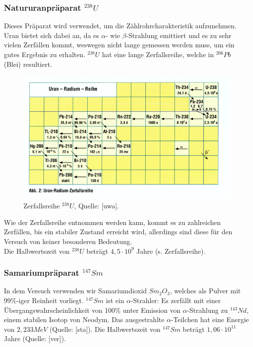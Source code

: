 \subsubsection{Natururanpräparat $^{238}U$}
Dieses Präparat wird verwendet, um die Zählrohrcharakteristik aufzunehmen. Uran bietet sich dabei an, da es $\alpha$- wie $\beta$-Strahlung emittiert und es zu sehr vielen Zerfällen kommt, weswegen nicht lange gemessen werden muss, um ein gutes Ergebnis zu erhalten. $^{238}U$ hat eine lange Zerfallsreihe, welche in $^{206}Pb$ (Blei) resultiert. 
\begin{figure}[h]
\begin{center}
\includegraphics[scale=0.6]{Bilder/uran}
\caption{Zerfallsreihe $^{238}U$, Quelle: [uwa].}
\end{center}
\end{figure}
Wie der Zerfallsreihe entnommen werden kann, kommt es zu zahlreichen Zerfällen, bis ein stabiler Zustand erreicht wird, allerdings sind diese für den Versuch von keiner besonderen Bedeutung. \\
Die Halbwertszeit von $^{238}U$ beträgt $4,5\cdot10^{9}$ Jahre (s. Zerfallsreihe).
\subsubsection{Samariumpräparat $^{147}Sm$}
In dem Versuch verwenden wir Samariumdioxid $Sm_{2}O_{3}$, welches als Pulver mit 99\%-iger Reinheit vorliegt. $^{147}Sm$ ist ein $\alpha$-Strahler: Es zerfällt mit einer Übergangswahrscheinlichkeit von 100\% unter Emission von $\alpha$-Strahlung zu $^{143}Nd$, einem stabilen Isotop von Neodym. Das ausgestrahlte $\alpha$-Teilchen hat eine Energie von $2,233 MeV$ (Quelle: [sta]). Die Halbwertszeit von $^{147}Sm$ beträgt $1,06\cdot10^{11}$ Jahre (Quelle: [ver]). 
